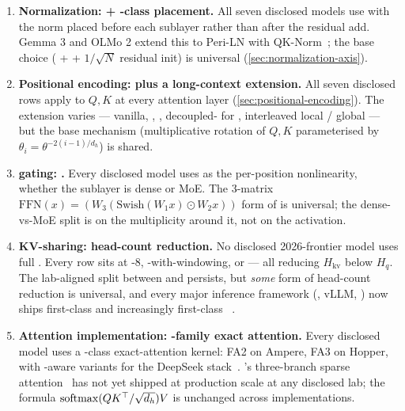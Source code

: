 \begin{enumerate}
\item \textbf{Normalization:  + -class placement.} All
seven disclosed models use  with the norm placed before each
sublayer rather than after the residual add. Gemma 3 and OLMo 2
extend this to Peri-LN with QK-Norm~\citep{gemma3,olmo2}; the base
choice ( +  + $1/\sqrt{N}$ residual init) is universal
(\cref{sec:normalization-axis}).

\item \textbf{Positional encoding:  plus a long-context
extension.} All seven disclosed rows apply  to $Q, K$ at every
attention layer (\cref{sec:positional-encoding}). The extension varies ---
vanilla, , , decoupled- for , interleaved
local / global --- but the base mechanism (multiplicative rotation
of $Q, K$ parameterised by $\theta_i = \theta^{-2(i-1)/d_h}$) is
shared.

\item \textbf{ gating: .} Every disclosed model uses
 as the per-position  nonlinearity, whether the sublayer
is dense or MoE. The 3-matrix
$\mathrm{FFN}(x) = (W_3 (\mathrm{Swish}(W_1 x) \odot W_2 x))$
form of \citet[Eq.~6]{shazeer2020} is universal; the dense-vs-MoE
split is on the multiplicity around it, not on the activation.

\item \textbf{KV-sharing: head-count reduction.} No disclosed
2026-frontier model uses full . Every row sits at -8,
-with-windowing, or  --- all reducing $H_{\mathrm{kv}}$ below
$H_q$. The lab-aligned split between  and  persists, but
\emph{some} form of head-count reduction is universal, and every
major inference framework (, vLLM, ) now ships
first-class  and increasingly first-class
~\citep{kwon2023,dao2023}.

\item \textbf{Attention implementation: -family exact
attention.} Every disclosed model uses a -class
exact-attention kernel: FA2 on Ampere, FA3 on Hopper, with
-aware variants for the DeepSeek
stack~\citep{dao2023,shah2024,deepseek-v3}. 's three-branch
sparse attention~\citep{yuan2025} has not yet shipped at production
scale at any disclosed lab; the formula
$\operatorname{softmax}(QK^\top/\sqrt{d_h})V$ is unchanged across implementations.
\end{enumerate}


